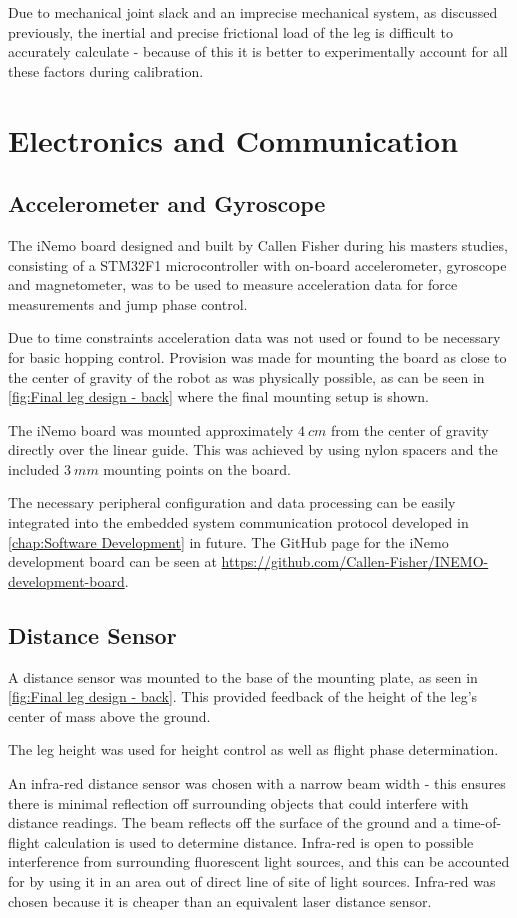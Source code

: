 Due to mechanical joint slack and an imprecise mechanical system, as discussed previously, the inertial and precise frictional load of the leg is difficult to accurately calculate - because of this it is better to experimentally account for all these factors during calibration.

\section{Electronics and Communication}
\subsection{Accelerometer and Gyroscope}

The iNemo board designed and built by Callen Fisher during his masters studies, consisting of a STM32F1 microcontroller with on-board accelerometer, gyroscope and magnetometer, was to be used to measure acceleration data for force measurements and jump phase control. 

Due to time constraints acceleration data was not used or found to be necessary for basic hopping control. Provision was made for mounting the board as close to the center of gravity of the robot as was physically possible, as can be seen in \cref{fig:Final leg design - back} where the final mounting setup is shown. 

The iNemo board was mounted approximately $4\ cm$ from the center of gravity directly over the linear guide. This was achieved by using nylon spacers and the included $3\ mm$ mounting points on the board.

The necessary peripheral configuration and data processing can be easily integrated into the embedded system communication protocol developed in \cref{chap:Software Development} in future. The GitHub page for the iNemo development board can be seen at \url{https://github.com/Callen-Fisher/INEMO-development-board}.

\subsection{Distance Sensor}
A distance sensor was mounted to the base of the mounting plate, as seen in \cref{fig:Final leg design - back}. This provided feedback of the height of the leg's center of mass above the ground.

The leg height was used for height control as well as flight phase determination.

An infra-red distance sensor was chosen with a narrow beam width - this ensures there is minimal reflection off surrounding objects that could interfere with distance readings. The beam reflects off the surface of the ground and a time-of-flight calculation is used to determine distance. Infra-red is open to possible interference from surrounding fluorescent light sources, and this can be accounted for by using it in an area out of direct line of site of light sources. Infra-red was chosen because it is cheaper than an equivalent laser distance sensor.

